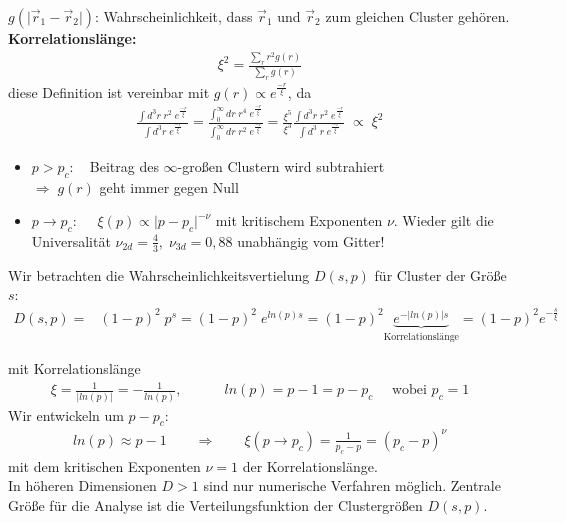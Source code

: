 \documentclass[12pt]{article}
\begin{document}
 	 $g( \vert \vec{r}_1 - \vec{r}_2 \vert)$: Wahrscheinlichkeit, dass $\vec{r}_1$ und $\vec{r}_2$ zum gleichen Cluster gehören. \\
 	\textbf{Korrelationslänge:}
 	 \begin{align}
 	\xi^2= \frac{\sum_r r^2 g(r)}{\sum_r g(r)}
 	\end{align}
 	diese Definition ist vereinbar mit $g(r) \propto e^\frac{-r}{\xi}$, da 
 	\begin{align}
 	\frac{\int d^3r \; r^2 \; e^\frac{-r}{\xi}}{\int d^3 r \; e^\frac{-r}{\xi}}
 	= \frac{\int_0^\infty dr \; r^4 \; e^\frac{-r}{\xi}}{\int_0^\infty d r \; r^2 \; e^\frac{-r}{\xi}}
 	= \frac{\xi^5}{\xi^3}  \frac{\int d^3r \; r^2 \; e^\frac{-r}{\xi}}{\int d^3\;  r \; e^\frac{-r}{\xi}} \; \propto \; \xi^2
 	\end{align}
 	
 	\begin{itemize}
 	\item $p>p_c: \quad$Beitrag des $\infty$-großen Clustern wird subtrahiert \\ $\Rightarrow \; g(r)$ geht immer gegen Null
 	\item $p \to p_c: \quad $ $\xi(p) \propto \vert p-p_c \vert^{-\nu}$ mit kritischem Exponenten $\nu$. Wieder gilt die Universalität $\nu_{2d} = \frac{4}{3}, \; \nu_{3d} = 0,88$ unabhängig vom Gitter!
 	
 	\end{itemize}

 	 	Wir betrachten die Wahrscheinlichkeitsvertielung $D(s,p)$ für Cluster der Größe $s$: 
\begin{align}
 	D(s,p)=& (1-p)^2 \; p^s
 	= (1-p)^2 \; e^{ln(p)s} = (1-p)^2 \underbrace{e^{- \vert ln(p) \vert s}}_\text{Korrelationslänge} = (1-p)^2 e^{-\frac{s}{\xi}}
\end{align}

 	mit Korrelationslänge
 	\begin{align*}
 	\xi = \frac{1}{\vert ln(p) \vert} = -\frac{1}{ln(p)}, \quad \quad \quad ln(p)= p-1= p-p_c \quad \mbox{ wobei } p_c=1
\end{align*}
Wir entwickeln um $p-p_c$: \begin{align*}
ln(p) \approx p-1  \quad \quad \Rightarrow \quad \quad  \xi (p \to p_c) = \frac{1}{p_c-p}= (p_c - p)^\nu 
\end{align*}
 	mit dem kritischen Exponenten $\nu =1$ der Korrelationslänge. \\
 	
 	In höheren Dimensionen $D>1$ sind nur numerische Verfahren möglich. Zentrale Größe für die Analyse ist die Verteilungsfunktion der Clustergrößen $D(s,p)$.
\end{document}
